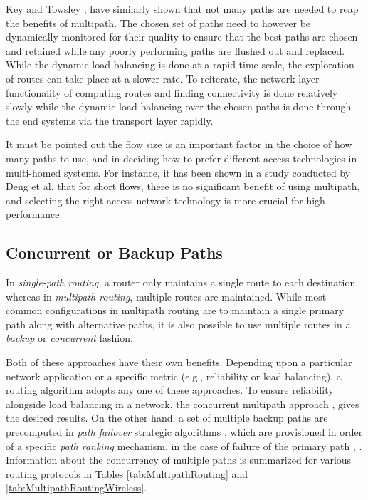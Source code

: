 \documentclass[10pt]{IEEEtran}
\begin{document}
Key and Towsley \cite{key2007path}, \cite{key2011path} have similarly shown that  not many paths are needed to reap the benefits of multipath. The chosen set of paths need to however be dynamically monitored for their quality to ensure that the best paths are chosen and retained while any poorly performing paths are flushed out and replaced. While the dynamic load balancing is done at a rapid time scale, the exploration of routes can take place at a slower rate. To reiterate, the network-layer functionality of computing routes and finding connectivity is done relatively slowly while the dynamic load balancing over the chosen paths is done through the end systems via the transport layer rapidly. 

It must be pointed out the flow size is an important factor in the choice of how many paths to use, and in deciding how to prefer different access technologies in multi-homed systems. For instance, it has been shown in a study conducted by Deng et al. \cite{deng2014wifi} that for short flows, there is no significant benefit of using multipath, and selecting the right access network technology is more crucial for high performance. 

\subsection{Concurrent or Backup Paths}
\label{sec:con_backup}

In \textit{single-path routing}, a router only maintains a single route to each destination, whereas in \textit{multipath routing}, multiple routes are maintained. While most common configurations in multipath routing are to maintain a single primary path along with alternative paths, it is also possible to use multiple routes in a \emph{backup} or \emph{concurrent} fashion. 



Both of these approaches have their own benefits. Depending upon a particular network application or a specific metric (e.g.,  reliability or load balancing), a routing algorithm adopts any one of these approaches. To ensure reliability alongside load balancing in a network, the concurrent multipath approach \cite{leung2001mp}, \cite{zhang2008designing} gives the desired results. On the other hand, a set of multiple backup paths are precomputed in \textit{path failover} strategic algorithms \cite{chiesa2014exploring}, which are provisioned in order of a specific \textit{path ranking} mechanism, in the case of failure of the primary path \cite{marina2001demand}, \cite{nasipuri1999demand}. Information about the concurrency of multiple paths is summarized for various routing protocols in Tables \ref{tab:MultipathRouting} and \ref{tab:MultipathRoutingWireless}. 
\end{document}

